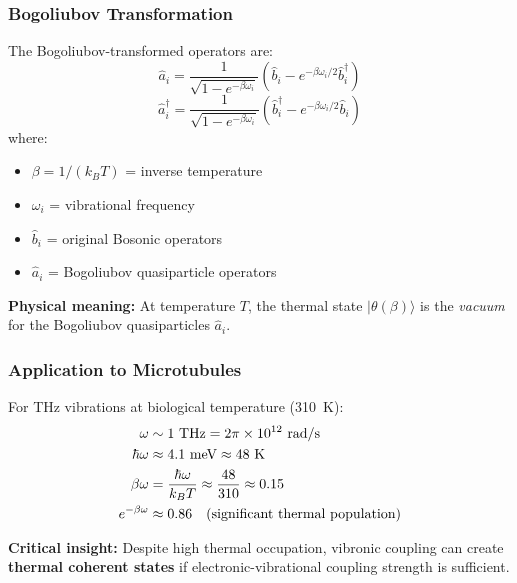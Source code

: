 \subsubsection{Bogoliubov Transformation}

The Bogoliubov-transformed operators are:
\begin{equation}
\hat{a}_i = \frac{1}{\sqrt{1 - e^{-\beta \omega_i}}} \left( \hat{b}_i - e^{-\beta \omega_i/2} \hat{b}_i^\dagger \right)
\label{eq:bogoliubov-a}
\end{equation}
\begin{equation}
\hat{a}_i^\dagger = \frac{1}{\sqrt{1 - e^{-\beta \omega_i}}} \left( \hat{b}_i^\dagger - e^{-\beta \omega_i/2} \hat{b}_i \right)
\label{eq:bogoliubov-adagger}
\end{equation}
where:
\begin{itemize}
\item $\beta = 1/(k_B T)$ = inverse temperature
\item $\omega_i$ = vibrational frequency
\item $\hat{b}_i$ = original Bosonic operators
\item $\hat{a}_i$ = Bogoliubov quasiparticle operators
\end{itemize}

\textbf{Physical meaning:} At temperature $T$, the thermal state $|\theta(\beta)\rangle$ is the \emph{vacuum} for the Bogoliubov quasiparticles $\hat{a}_i$.

\subsubsection{Application to Microtubules}

For THz vibrations at biological temperature (310~K):
\begin{align}
\omega &\sim 1 \text{ THz} = 2\pi \times 10^{12} \text{ rad/s} \notag \\
\hbar\omega &\approx 4.1 \text{ meV} \approx 48 \text{ K} \label{eq:thz-energy} \\
\beta\omega &= \frac{\hbar\omega}{k_B T} \approx \frac{48}{310} \approx 0.15 \label{eq:beta-omega} \\
e^{-\beta\omega} &\approx 0.86 \quad \text{(significant thermal population)} \label{eq:thermal-factor}
\end{align}

\textbf{Critical insight:} Despite high thermal occupation, vibronic coupling can create \textbf{thermal coherent states} if electronic-vibrational coupling strength is sufficient.

